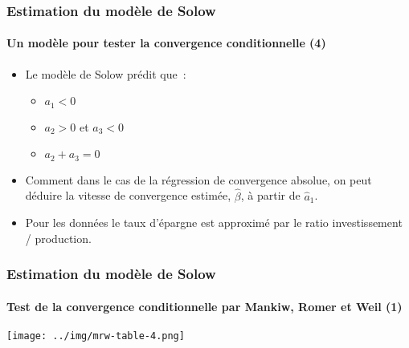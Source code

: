 \documentclass[10pt,notheorems]{beamer}
\theoremstyle{plain}
\theoremstyle{definition} %
\begin{document}
\begin{frame}
  \frametitle{Estimation du modèle de Solow}
  \framesubtitle{Un modèle pour tester la convergence conditionnelle (4)}

  \begin{itemize}

  \item Le modèle de Solow prédit que~:\newline

    \begin{itemize}

    \item $a_1<0$

    \item $a_2>0$ et $a_3<0$

    \item $a_2+a_3 = 0$\newline

    \end{itemize}

  \item Comment dans le cas de la régression de convergence absolue, on peut déduire la vitesse de convergence estimée, $\hat\beta$, à partir de $\hat a_1$.\newline

  \item Pour les données le taux d'épargne est approximé par le ratio investissement / production.

  \end{itemize}

\end{frame}


\begin{frame}
  \frametitle{Estimation du modèle de Solow}
  \framesubtitle{Test de la convergence conditionnelle par Mankiw, Romer et Weil (1)}

  \begin{center}
    \texttt{[image: ../img/mrw-table-4.png]}
  \end{center}

\end{frame}
\end{document}
